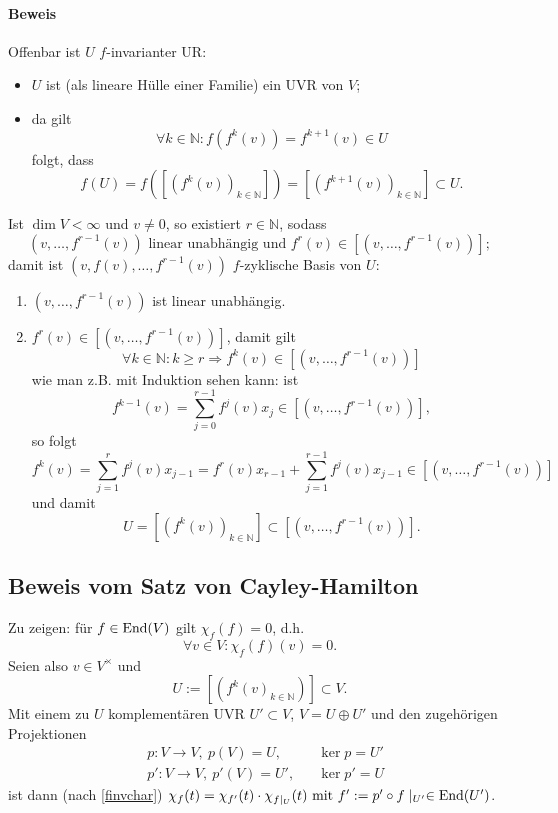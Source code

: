 \paragraph{Beweis}
	Offenbar ist $ U $ $ f $-invarianter UR:
	\begin{itemize}
		\item $ U $ ist (als lineare Hülle einer Familie) ein UVR von $ V $;
		\item da gilt
			\[ \forall k\in \mathbb{N}: f\left(f^k(v)\right)=f^{k+1}(v)\in U \]
		folgt, dass
			\[f(U) = f\left(\left[\left(f^k(v)\right)_{k\in{\mathbb{N}}}\right]\right) = \left[\left(f^{k+1}(v)\right)_{k\in{\mathbb{N}}}\right]\subset U. \]
	\end{itemize}
	Ist $ \dim V < \infty $ und $ v\neq 0 $, so existiert $ r\in \mathbb{N} $, sodass
		\[ \left(v,\dots,f^{r-1}(v)\right) \text{ linear unabhängig und }f^r(v)\in\left[\left(v,\dots,f^{r-1}(v)\right)\right]; \]
	damit ist $ \left(v,f(v),\dots, f^{r-1}(v)\right) $ $ f $-zyklische Basis von $ U $:
	\begin{enumerate}
		\item $ \left(v,\dots,f^{r-1}(v) \right) $ ist linear unabhängig.
		\item $ f^r(v) \in \left[\left(v,\dots,f^{r-1}(v)\right)\right]$, damit gilt
		\[ \forall k\in \mathbb{N}: k\geq r \Rightarrow f^k(v)\in \left[\left(v,\dots,f^{r-1}(v)\right)\right] \]
		wie man z.B. mit Induktion sehen kann: ist
			\[ f^{k-1}(v) = \sum_{j=0}^{r-1}f^j(v)x_j \in \left[\left(v,\dots,f^{r-1}(v)\right) \right], \]
		so folgt
			\[ f^k(v) = \sum_{j=1}^{r}f^j(v)x_{j-1}=f^{r}(v)x_{r-1}+\sum_{j=1}^{r-1}f^j(v)x_{j-1}\in \left[\left(v,\dots,f^{r-1}(v)\right)\right] \]
		und damit
			\[ U = \left[\left(f^k(v)\right)_{k\in \mathbb{N}}\right]\subset \left[\left(v,\dots,f^{r-1}(v)\right)\right]. \]
	\end{enumerate}
		
\subsection{Beweis vom Satz von Cayley-Hamilton}
	Zu zeigen: für $ f\in \operatorname{End}(V) $ gilt $ \chi_f(f)=0 $, d.h.
		\[ \forall v\in V:\chi_f(f)(v) = 0. \]
	Seien also $ v\in V^\times $ und
		\[ U := \left[\left( f^k(v)_{k\in \mathbb{N}}\right)\right]\subset V. \]
	Mit einem zu $ U $ komplementären UVR $ U'\subset V $, $ V=U\oplus U' $ und den zugehörigen Projektionen
		\[\begin{aligned}
		&p: V\to V,\ p(V) = U, &&\ker p = U' \\
		&p':V\to V,\ p'(V) = U', &&\ker p' = U
		\end{aligned}\]
	ist dann (nach \ref{finvchar}) $ \chi_f(t) = \chi_{f'}(t)\cdot \chi_{f\mid_U}(t) \text{ mit } f' := p'\circ f\mid_{U'}\in \operatorname{End}(U') $.
	
